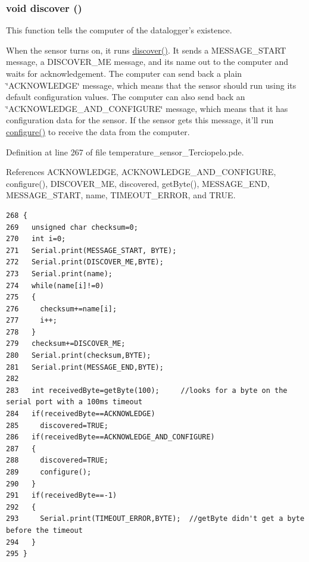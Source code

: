 \hypertarget{temperature__sensor___terciopelo_8pde_3fdb2350c3f98c0de0f0ae3c831a8b14}{
\subsubsection[{discover}]{\setlength{\rightskip}{0pt plus 5cm}void discover ()}}
\label{temperature__sensor___terciopelo_8pde_3fdb2350c3f98c0de0f0ae3c831a8b14}


This function tells the computer of the datalogger's existence. 

When the sensor turns on, it runs \hyperlink{applet_2nublogger_8h_3fdb2350c3f98c0de0f0ae3c831a8b14}{discover()}. It sends a MESSAGE\_\-START message, a DISCOVER\_\-ME message, and its name out to the computer and waits for acknowledgement. The computer can send back a plain \char`\"{}ACKNOWLEDGE\char`\"{} message, which means that the sensor should run using its default configuration values. The computer can also send back an \char`\"{}ACKNOWLEDGE\_\-AND\_\-CONFIGURE\char`\"{} message, which means that it has configuration data for the sensor. If the sensor gets this message, it'll run \hyperlink{applet_2nublogger_8h_e369b3765489ee8bd0ea791c1843630f}{configure()} to receive the data from the computer. 

Definition at line 267 of file temperature\_\-sensor\_\-Terciopelo.pde.

References ACKNOWLEDGE, ACKNOWLEDGE\_\-AND\_\-CONFIGURE, configure(), DISCOVER\_\-ME, discovered, getByte(), MESSAGE\_\-END, MESSAGE\_\-START, name, TIMEOUT\_\-ERROR, and TRUE.

\begin{Code}\begin{verbatim}268 { 
269   unsigned char checksum=0;
270   int i=0;
271   Serial.print(MESSAGE_START, BYTE);
272   Serial.print(DISCOVER_ME,BYTE);
273   Serial.print(name);
274   while(name[i]!=0)
275   {
276     checksum+=name[i];
277     i++;
278   }
279   checksum+=DISCOVER_ME;
280   Serial.print(checksum,BYTE);
281   Serial.print(MESSAGE_END,BYTE);
282 
283   int receivedByte=getByte(100);     //looks for a byte on the serial port with a 100ms timeout
284   if(receivedByte==ACKNOWLEDGE)
285     discovered=TRUE;
286   if(receivedByte==ACKNOWLEDGE_AND_CONFIGURE)
287   {
288     discovered=TRUE;
289     configure();
290   }
291   if(receivedByte==-1)
292   {
293     Serial.print(TIMEOUT_ERROR,BYTE);  //getByte didn't get a byte before the timeout
294   }  
295 }
\end{verbatim}
\end{Code}


